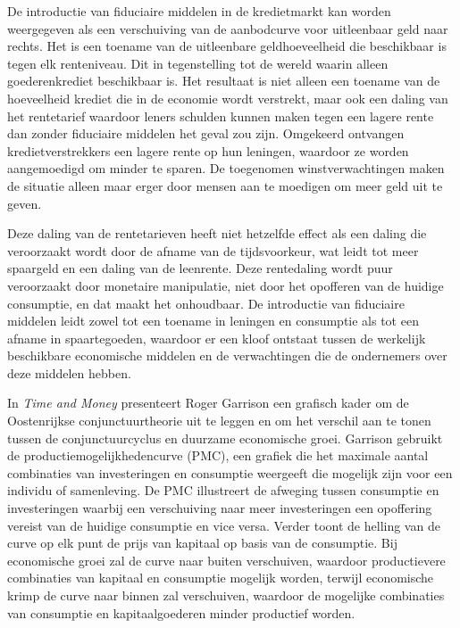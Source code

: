 De introductie van fiduciaire middelen in de kredietmarkt kan worden weergegeven als een verschuiving van de aanbodcurve voor uitleenbaar geld naar rechts. Het is een toename van de uitleenbare geldhoeveelheid die beschikbaar is tegen elk renteniveau. Dit in tegenstelling tot de wereld waarin alleen goederenkrediet beschikbaar is. Het resultaat is niet alleen een toename van de hoeveelheid krediet die in de economie wordt verstrekt, maar ook een daling van het rentetarief waardoor leners schulden kunnen maken tegen een lagere rente dan zonder fiduciaire middelen het geval zou zijn. Omgekeerd ontvangen kredietverstrekkers een lagere rente op hun leningen, waardoor ze worden aangemoedigd om minder te sparen. De toegenomen winstverwachtingen maken de situatie alleen maar erger door mensen aan te moedigen om meer geld uit te geven.

Deze daling van de rentetarieven heeft niet hetzelfde effect als een daling die veroorzaakt wordt door de afname van de tijdsvoorkeur, wat leidt tot meer spaargeld en een daling van de leenrente. Deze rentedaling wordt puur veroorzaakt door monetaire manipulatie, niet door het opofferen van de huidige consumptie, en dat maakt het onhoudbaar. De introductie van fiduciaire middelen leidt zowel tot een toename in leningen en consumptie als tot een afname in spaartegoeden, waardoor er een kloof ontstaat tussen de werkelijk beschikbare economische middelen en de verwachtingen die de ondernemers over deze middelen hebben.

In \emph{Time and Money} presenteert Roger Garrison een grafisch kader om de Oostenrijkse conjunctuurtheorie uit te leggen en om het verschil aan te tonen tussen de conjunctuurcyclus en duurzame economische groei. Garrison gebruikt de productiemogelijkhedencurve (PMC), een grafiek die het maximale aantal combinaties van investeringen en consumptie weergeeft die mogelijk zijn voor een individu of samenleving.\autocite{175} De PMC illustreert de afweging tussen consumptie en investeringen waarbij een verschuiving naar meer investeringen een opoffering vereist van de huidige consumptie en vice versa. Verder toont de helling van de curve op elk punt de prijs van kapitaal op basis van de consumptie. Bij economische groei zal de curve naar buiten verschuiven, waardoor productievere combinaties van kapitaal en consumptie mogelijk worden, terwijl economische krimp de curve naar binnen zal verschuiven, waardoor de mogelijke combinaties van consumptie en kapitaalgoederen minder productief worden.

